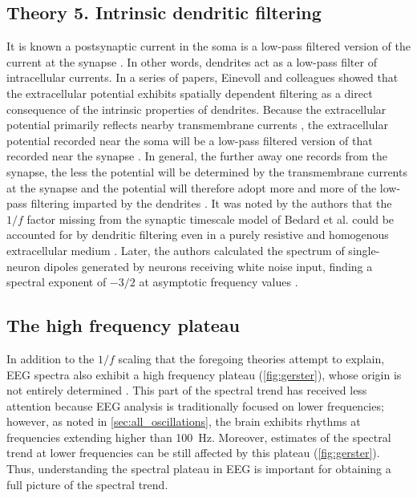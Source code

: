 \subsection{Theory 5. Intrinsic dendritic filtering}
It is known a postsynaptic current in the soma is a low-pass filtered version of the current at the synapse \cite{Rall1967}. In other words, dendrites act as a low-pass filter of intracellular currents. In a series of papers, Einevoll and colleagues showed that the extracellular potential exhibits spatially dependent filtering as a direct consequence of the intrinsic properties of dendrites. Because the extracellular potential primarily reflects nearby transmembrane currents \cite{Nunez2006}, the extracellular potential recorded near the soma will be a low-pass filtered version of that recorded near the synapse \cite{Linden2010}. In general, the further away one records from the synapse, the less the potential will be determined by the transmembrane currents at the synapse and the potential will therefore adopt more and more of the low-pass filtering imparted by the dendrites \cite{Linden2010}. It was noted by the authors that the $1/f$ factor missing from the synaptic timescale model of Bedard et al. \cite{Bedard2006} could be accounted for by dendritic filtering even in a purely resistive and homogenous extracellular medium \cite{Linden2010,Pettersen2008}. Later, the authors calculated the spectrum of single-neuron dipoles generated by neurons receiving white noise input, finding a spectral exponent of $-3/2$ at asymptotic frequency values \cite{Pettersen2014}.

\subsection{The high frequency plateau}
In addition to the $1/f$ scaling that the foregoing theories attempt to explain, EEG spectra also exhibit a high frequency plateau (\autoref{fig:gerster}), whose origin is not entirely determined \cite{Gerster2022}. This part of the spectral trend has received less attention because EEG analysis is traditionally focused on lower frequencies; however, as noted in \autoref{sec:all_oscillations}, the brain exhibits rhythms at frequencies extending higher than \qty{100}{\hertz}. Moreover, estimates of the spectral trend at lower frequencies can be still affected by this plateau (\autoref{fig:gerster}). Thus, understanding the spectral plateau in EEG is important for obtaining a full picture of the spectral trend. 

